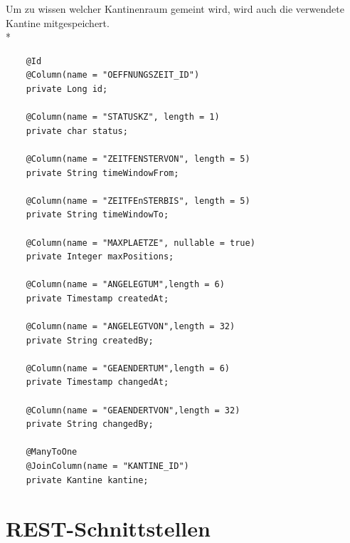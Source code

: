 Um zu wissen welcher Kantinenraum gemeint wird,  wird auch die verwendete Kantine mitgespeichert. \\*

\begin{lstlisting}
    @Id
    @Column(name = "OEFFNUNGSZEIT_ID")
    private Long id;

    @Column(name = "STATUSKZ", length = 1)
    private char status;

    @Column(name = "ZEITFENSTERVON", length = 5)
    private String timeWindowFrom;

    @Column(name = "ZEITFEnSTERBIS", length = 5)
    private String timeWindowTo;

    @Column(name = "MAXPLAETZE", nullable = true)
    private Integer maxPositions;

    @Column(name = "ANGELEGTUM",length = 6)
    private Timestamp createdAt;

    @Column(name = "ANGELEGTVON",length = 32)
    private String createdBy;

    @Column(name = "GEAENDERTUM",length = 6)
    private Timestamp changedAt;

    @Column(name = "GEAENDERTVON",length = 32)
    private String changedBy;

    @ManyToOne
    @JoinColumn(name = "KANTINE_ID")
    private Kantine kantine;
\end{lstlisting}

\section{REST-Schnittstellen}



